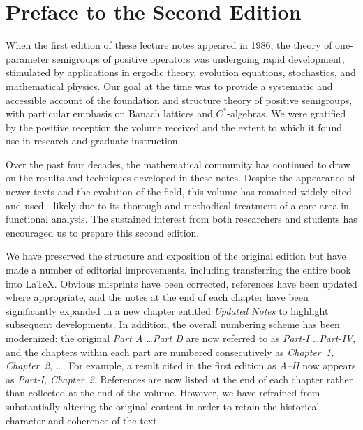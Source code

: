 %

\preface
\setcounter{page}{1}
\thispagestyle{empty}
\section*{Preface to the Second Edition}

When the first edition of these lecture notes appeared in 1986, the theory of one-parameter semigroups of positive operators was undergoing rapid development, stimulated by applications in ergodic theory, evolution equations, stochastics, and mathematical physics. 
Our goal at the time was to provide a systematic and accessible account of the foundation and structure theory of positive semigroups, with particular emphasis on Banach lattices and $C^*$-algebras. 
We were gratified by the positive reception the volume received and the extent to which it found use in research and graduate instruction.

Over the past four decades, the mathematical community has continued to draw on the results and techniques developed in these notes. 
Despite the appearance of newer texts and the evolution of the field, this volume has remained widely cited and used---likely due to its thorough and methodical treatment of a core area in functional analysis. 
The sustained interest from both researchers and students has encouraged us to prepare this second edition.

We have preserved the structure and exposition of the original edition but have made a number of editorial improvements, including transferring the entire book into \LaTeX{}. 
Obvious misprints have been corrected, references have been updated where appropriate, and the notes at the end of each chapter have been significantly expanded in a new chapter entitled \emph{Updated Notes} to highlight subsequent developments. 
In addition, the overall numbering scheme has been modernized: the original \emph{Part A \ldots Part D} are now referred to as \emph{Part-I \ldots Part-IV}, and the chapters within each part are numbered consecutively as 
\emph{Chapter~1, Chapter~2, \ldots}. 
For example, a result cited in the first edition as \emph{A–II} now appears as \emph{Part-I, Chapter~2}. 
References are now listed at the end of each chapter rather than collected at the end of the volume. 
However, we have refrained from substantially altering the original content in order to retain the historical character and coherence of the text.

